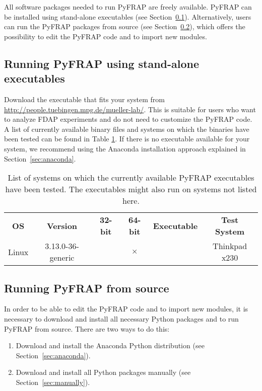 \documentclass[a4paper,11pt]{article}
\begin{document}
All software packages needed to run PyFRAP are freely available. PyFRAP can be installed using stand-alone executables (see Section~\ref{sec:executable}). Alternatively, users can run the PyFRAP packages from source (see Section~\ref{sec:source}), which offers the possibility to edit the PyFRAP code and to import new modules.

\subsection{Running PyFRAP using stand-alone executables}
\label{sec:executable}
Download the executable that fits your system from \href{http://people.tuebingen.mpg.de/mueller-lab/}{http://people.tuebingen.mpg.de/mueller-lab/}. This is suitable for users who want to analyze FDAP experiments and do not need to customize the PyFRAP code. A list of currently available binary files and systems on which the binaries have been tested can be found in Table \ref{tab:executables}. If there is no executable available for your system, we recommend using the Anaconda installation approach explained in Section~\ref{sec:anaconda}.
 
 \begin{table}[H]
  \small
\centering
 \begin{tabular}{c|c|c|c|c|c}
  \textbf{OS} & \textbf{Version} & \textbf{32-bit} & \textbf{64-bit} & \textbf{Executable} & \textbf{Test System} \\
\hhline{=|=|=|=|=|=}
Linux & 3.13.0-36-generic & & $\mathbf{\times}$ &  & Thinkpad x230 \\ 
\hline
 \end{tabular}
\caption{List of systems on which the currently available PyFRAP executables have been tested. The executables might also run on systems not listed here.}
\label{tab:executables}
\end{table}

\subsection{Running PyFRAP from source}
\label{sec:source}
In order to be able to edit the PyFRAP code and to import new modules, it is necessary to download and install all necessary Python packages and to run PyFRAP from source. There are two ways to do this:
 \begin{enumerate}
  \item Download and install the Anaconda Python distribution (see Section~\ref{sec:anaconda}).
  \item Download and install all Python packages manually (see Section~\ref{sec:manually}).
 \end{enumerate}
 
\end{document}
